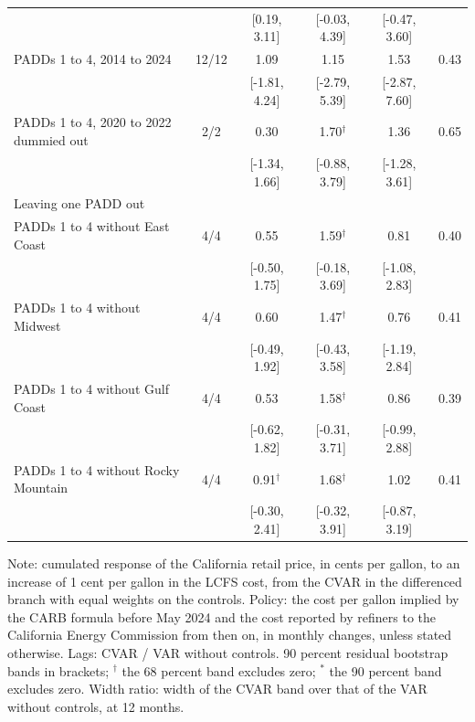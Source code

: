\begin{table}[htbp]
\begin{tabular}{lccccc}
\footnotesize  &  & [0.19, 3.11] & [-0.03, 4.39] & [-0.47, 3.60] &  \\[2pt]
PADDs 1 to 4, 2014 to 2024 & 12/12 & 1.09 & 1.15 & 1.53 & 0.43 \\
\footnotesize  &  & [-1.81, 4.24] & [-2.79, 5.39] & [-2.87, 7.60] &  \\[2pt]
PADDs 1 to 4, 2020 to 2022 dummied out & 2/2 & 0.30 & 1.70$^{\dagger}$ & 1.36 & 0.65 \\
\footnotesize  &  & [-1.34, 1.66] & [-0.88, 3.79] & [-1.28, 3.61] &  \\[2pt]
\midrule
\multicolumn{6}{l}{Leaving one PADD out} \\
\midrule
PADDs 1 to 4 without East Coast & 4/4 & 0.55 & 1.59$^{\dagger}$ & 0.81 & 0.40 \\
\footnotesize  &  & [-0.50, 1.75] & [-0.18, 3.69] & [-1.08, 2.83] &  \\[2pt]
PADDs 1 to 4 without Midwest & 4/4 & 0.60 & 1.47$^{\dagger}$ & 0.76 & 0.41 \\
\footnotesize  &  & [-0.49, 1.92] & [-0.43, 3.58] & [-1.19, 2.84] &  \\[2pt]
PADDs 1 to 4 without Gulf Coast & 4/4 & 0.53 & 1.58$^{\dagger}$ & 0.86 & 0.39 \\
\footnotesize  &  & [-0.62, 1.82] & [-0.31, 3.71] & [-0.99, 2.88] &  \\[2pt]
PADDs 1 to 4 without Rocky Mountain & 4/4 & 0.91$^{\dagger}$ & 1.68$^{\dagger}$ & 1.02 & 0.41 \\
\footnotesize  &  & [-0.30, 2.41] & [-0.32, 3.91] & [-0.87, 3.19] &  \\[2pt]
\bottomrule
\end{tabular}
\begin{minipage}{0.95\textwidth}\footnotesize
Note: cumulated response of the California retail price, in cents per gallon, to an increase of 1 cent per gallon in the LCFS cost, from the CVAR in the differenced branch with equal weights on the controls. Policy: the cost per gallon implied by the CARB formula before May 2024 and the cost reported by refiners to the California Energy Commission from then on, in monthly changes, unless stated otherwise. Lags: CVAR / VAR without controls. 90 percent residual bootstrap bands in brackets; $^{\dagger}$ the 68 percent band excludes zero; $^{*}$ the 90 percent band excludes zero. Width ratio: width of the CVAR band over that of the VAR without controls, at 12 months.
\end{minipage}
\end{table}

